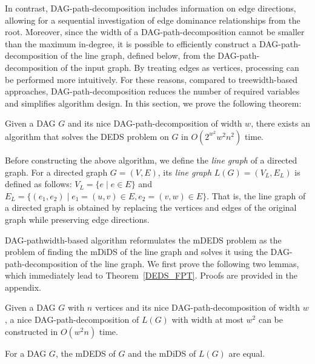 \documentclass[runningheads]{llncs}
\theoremstyle{plain}
\theoremstyle{definition}
\begin{document}
In contrast, DAG-path-decomposition includes information on edge directions, allowing for a sequential investigation of edge dominance relationships from the root.  
Moreover, since the width of a DAG-path-decomposition cannot be smaller than the maximum in-degree, it is possible to efficiently construct a DAG-path-decomposition of the line graph, defined below, from the DAG-path-decomposition of the input graph.  
By treating edges as vertices, processing can be performed more intuitively.  
For these reasons, compared to treewidth-based approaches, DAG-path-decomposition reduces the number of required variables and simplifies algorithm design.  
In this section, we prove the following theorem:  

\begin{theorem}\label{DEDS_FPT}
    Given a DAG \(G\) and its nice DAG-path-decomposition of width \(w\), there exists an algorithm that solves the DEDS problem on \(G\) in \(O(2^{w^2} w^2 n^2)\) time.  
\end{theorem}

Before constructing the above algorithm, we define the \emph{line graph} of a directed graph.  
For a directed graph \(G = (V, E)\), its \emph{line graph} \(L(G) = (V_L, E_L)\) is defined as follows:  
\(V_L = \{e \mid e \in E\}\) and \(E_L = \{(e_1, e_2) \mid e_1 = (u, v) \in E, e_2 = (v, w) \in E\}\).  
That is, the line graph of a directed graph is obtained by replacing the vertices and edges of the original graph while preserving edge directions.  

DAG-pathwidth-based algorithm reformulates the mDEDS problem as the problem of finding the mDiDS of the line graph and solves it using the DAG-path-decomposition of the line graph.  
We first prove the following two lemmas, which immediately lead to Theorem~\ref{DEDS_FPT}.  
Proofs are provided in the appendix.  

\begin{lemma}\label{DAG_path_decomposition(L(G))}
    Given a DAG \(G\) with \(n\) vertices and its nice DAG-path-decomposition of width \(w\), a nice DAG-path-decomposition of \(L(G)\) with width at most \(w^2\) can be constructed in \(O(w^2 n)\) time.  
\end{lemma}

\begin{lemma}\label{mDEDS_mDiDS}
    For a DAG \(G\), the mDEDS of \(G\) and the mDiDS of \(L(G)\) are equal.  
\end{lemma}
\end{document}
